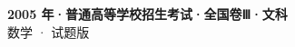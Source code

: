 \documentclass[zihao=-4, a4paper]{ctexart}
\begin{document}
\begin{center}
  {\Large\bfseries 2005 年·普通高等学校招生考试·全国卷Ⅲ·文科}\\[4pt]
  {\large 数学 · 试题版}
\end{center}
\medskip
{}

\end{document}
